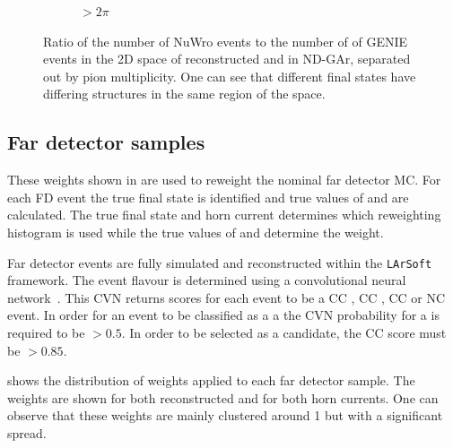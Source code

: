 \begin{figure}[t]
\begin{subfigure}[t]{.5\linewidth}
		\begin{adjustbox}{max totalsize=\linewidth, center}
			
		\end{adjustbox}
		\caption{$>2\pi$}
	\end{subfigure}
	\caption[Ratio of NuWro to GENIE of two-dimensional distributions of \evis and \pvis in ND-GAr]{Ratio of the number of NuWro events to the number of of GENIE events in the 2D space of reconstructed \evis and \pvis in ND-GAr, separated out by pion multiplicity. One can see that different final states have differing structures in the same region of the space.}
	\label{fig:q0q3RatioFhc}
\end{figure}

\subsection{Far detector samples}
\label{sec:dune_ndrwt:rwt:fd}

These weights shown in  are used to reweight the nominal far detector MC.
For each FD event the true final state is identified and true values of \evis and \pvis are calculated.
The true final state and horn current determines which reweighting histogram is used while the true values of \evis and \pvis determine the weight.

Far detector events are fully simulated and reconstructed within the \texttt{LArSoft}~\cite{larsoft} framework.
The event flavour is determined using a convolutional neural network~\cite{duneCVN}.
This CVN returns scores for each event to be a CC \numu, CC \nue, CC \nutau or NC event.
In order for an event to be classified as a \numu a the CVN probability for a \numu is required to be $>0.5$. 
In order to be selected as a \nue candidate, the CC \nue score must be $>0.85$. 

 shows the distribution of weights applied to each far detector sample.
The weights are shown for both reconstructed \numu and \nue for both horn currents.
One can observe that these weights are mainly clustered around 1 but with a significant spread.

